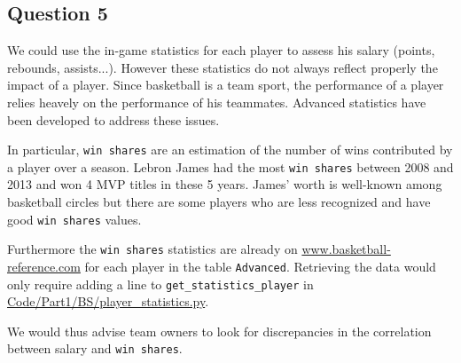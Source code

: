 
\subsection{Question 5}
\label{subsec:415}

We could use the in-game statistics for each player to assess his salary (points, rebounds, assists...). However these statistics do not always reflect properly the impact of a player. Since basketball is a team sport, the performance of a player relies heavely on the performance of his teammates. Advanced statistics have been developed to address these issues. 

In particular, \verb|win shares| are an estimation of the number of wins contributed by a player over a season. Lebron James had the most \verb|win shares| between 2008 and 2013 and won 4 MVP titles in these 5 years. James' worth is well-known among basketball circles but there are some players who are less recognized and have good \verb|win shares| values.

Furthermore the \verb|win shares| statistics are already on \url{www.basketball-reference.com} for each player in the table \verb|Advanced|. Retrieving the data would only require adding a line to \verb|get_statistics_player| in \url{Code/Part1/BS/player_statistics.py}.

We would thus advise team owners to look for discrepancies in the correlation between salary and \verb|win shares|.
